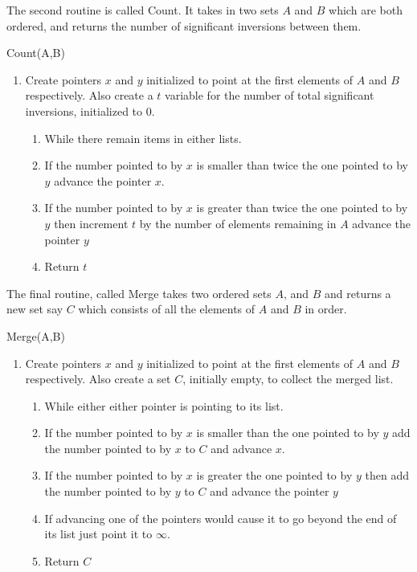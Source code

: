 \documentclass{article}
\begin{document}
The second routine is called Count. It takes in two sets $A$ and $B$ which are both ordered, and returns the number of significant inversions between them.

\begin{center}Count(A,B)\end{center}
\begin{enumerate}
\item Create  pointers $x$ and $y$ initialized to point at the first elements of $A$ and $ B$ respectively. Also create a $t$ variable for the number of total significant inversions, initialized to 0.
\begin{enumerate}
\item While there remain items in either lists.
\item If the number pointed to by $x$ is smaller than twice the one pointed to by $y$ advance the pointer $x$.
\item If the number pointed to by $x$ is greater than twice the one pointed to by $y$ then increment $t$ by the number of elements remaining in $A$ advance the pointer $y$
\item Return $t$
\end{enumerate}
\end{enumerate}

The final routine, called Merge takes two ordered sets $A$, and $B$ and returns a new set say $C$ which consists of all the elements of $A$ and $B$ in order.

\begin{center}Merge(A,B)\end{center}
\begin{enumerate}
\item Create  pointers $x$ and $y$ initialized to point at the first elements of $A$ and $ B$ respectively. Also create a set $C$, initially empty, to collect the merged list.
\begin{enumerate}
\item While either either pointer is pointing to its list.
\item If the number pointed to by $x$ is smaller than the one pointed to by $y$ add the number pointed to by $x$ to $C$ and advance $x$.
\item If the number pointed to by $x$ is greater the one pointed to by $y$ then add the number pointed to by $y$ to $C$ and advance the pointer $y$
\item If advancing one of the pointers would cause it to go beyond the end of its list just point it to $\infty$.
\item Return $C$
\end{enumerate}
\end{enumerate}
\end{document}

